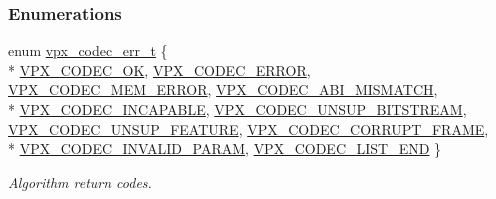 \subsubsection*{Enumerations}
\begin{DoxyCompactItemize}
\item 
enum \hyperlink{group__codec_gada1084710837ad363b92f2379dd2b8d2}{vpx\-\_\-codec\-\_\-err\-\_\-t} \{ \\*
\hyperlink{group__codec_ggada1084710837ad363b92f2379dd2b8d2af1dcde74b1c5ff7b29f31246dfd90986}{V\-P\-X\-\_\-\-C\-O\-D\-E\-C\-\_\-\-O\-K}, 
\hyperlink{group__codec_ggada1084710837ad363b92f2379dd2b8d2abd8a8f9c2588adab5d764d957e265135}{V\-P\-X\-\_\-\-C\-O\-D\-E\-C\-\_\-\-E\-R\-R\-O\-R}, 
\hyperlink{group__codec_ggada1084710837ad363b92f2379dd2b8d2a96c6d2600dc0ec25c2cb798e8d2f4760}{V\-P\-X\-\_\-\-C\-O\-D\-E\-C\-\_\-\-M\-E\-M\-\_\-\-E\-R\-R\-O\-R}, 
\hyperlink{group__codec_ggada1084710837ad363b92f2379dd2b8d2afe8f723512f728bc518bbfba3b96d324}{V\-P\-X\-\_\-\-C\-O\-D\-E\-C\-\_\-\-A\-B\-I\-\_\-\-M\-I\-S\-M\-A\-T\-C\-H}, 
\\*
\hyperlink{group__codec_ggada1084710837ad363b92f2379dd2b8d2a4470784ba5a3ef84dc0697d5489dd292}{V\-P\-X\-\_\-\-C\-O\-D\-E\-C\-\_\-\-I\-N\-C\-A\-P\-A\-B\-L\-E}, 
\hyperlink{group__codec_ggada1084710837ad363b92f2379dd2b8d2afff886e57782098a3df13d4e349ca973}{V\-P\-X\-\_\-\-C\-O\-D\-E\-C\-\_\-\-U\-N\-S\-U\-P\-\_\-\-B\-I\-T\-S\-T\-R\-E\-A\-M}, 
\hyperlink{group__codec_ggada1084710837ad363b92f2379dd2b8d2a8a86701e65d826d82651537aadd6c539}{V\-P\-X\-\_\-\-C\-O\-D\-E\-C\-\_\-\-U\-N\-S\-U\-P\-\_\-\-F\-E\-A\-T\-U\-R\-E}, 
\hyperlink{group__codec_ggada1084710837ad363b92f2379dd2b8d2a29d03c009e0479dbf4ecbd8db1011b85}{V\-P\-X\-\_\-\-C\-O\-D\-E\-C\-\_\-\-C\-O\-R\-R\-U\-P\-T\-\_\-\-F\-R\-A\-M\-E}, 
\\*
\hyperlink{group__codec_ggada1084710837ad363b92f2379dd2b8d2ab5857f7b5f03f8ca164fab8843a979df}{V\-P\-X\-\_\-\-C\-O\-D\-E\-C\-\_\-\-I\-N\-V\-A\-L\-I\-D\-\_\-\-P\-A\-R\-A\-M}, 
\hyperlink{group__codec_ggada1084710837ad363b92f2379dd2b8d2a452450a5adfcc14ef8a0ac12611dae21}{V\-P\-X\-\_\-\-C\-O\-D\-E\-C\-\_\-\-L\-I\-S\-T\-\_\-\-E\-N\-D}
 \}
\begin{DoxyCompactList}\small\item\em Algorithm return codes. \end{DoxyCompactList}\end{DoxyCompactItemize}
